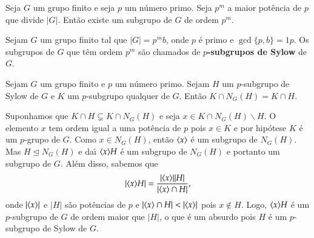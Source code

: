 \begin{corolario}
	Seja $G$ um grupo finito e seja $p$ um n\'umero primo. Seja $p^m$ a maior pot\^encia de $p$ que divide $|G|$. Ent\~ao existe um subgrupo de $G$ de ordem $p^m$.
\end{corolario}

\begin{definicao}
Sejam $G$ um grupo finito tal que $|G| =
p^m b$, onde $p$ {\'e} primo e $\gcd\{p, b\} = 1p$. Os subgrupos de $G$ que t\^em ordem $p^m$ s\~ao chamados de
\textbf{$p$-subgrupos de Sylow} de $G$.
\end{definicao}

\begin{lema}
	Sejam $G$ um grupo finito e $p$ um n\'umero primo. Sejam $H$ um $p$-subgrupo de Sylow de $G$ e $K$ um $p$-subgrupo qualquer de $G$. Ent\~ao $K \cap N_G(H) = K \cap H$.
\end{lema}
\begin{prova}
	Suponhamos que $K \cap H \varsubsetneq K \cap N_G(H)$ e seja $x \in K \cap N_G(H)\backslash H$. O elemento $x$ tem ordem igual a uma pot\^encia de $p$ pois $x \in K$ e por hip\'otese $K$ \'e um $p$-grupo de $G$. Como $x \in N_G(H)$, ent\~ao $\langle{x}\rangle$ \'e um subgrupo de $N_G(H)$. Mas $H \unlhd N_G(H)$ e da{\'\i} $\langle{x}\rangle H$ \'e um subgrupo de $N_G(H)$ e portanto um subgrupo de $G$. Al\'em disso, sabemos que
	\[
		|\langle{x}\rangle H| = \dfrac{|\langle{x}\rangle||H|}{|\langle{x}\rangle\cap H|},
	\]
	onde $|\langle{x}\rangle|$ e $|H|$ s\~ao pot\^encias de $p$ e $|\langle{x}\rangle\cap H| < |\langle{x}\rangle|$ pois $x \notin H$. Logo, $\langle{x}\rangle H$ \'e um $p$-subgrupo de $G$ de ordem maior que $|H|$, o que \'e um absurdo pois $H$ \'e um $p$-subgrupo de Sylow de $G$.
\end{prova}

